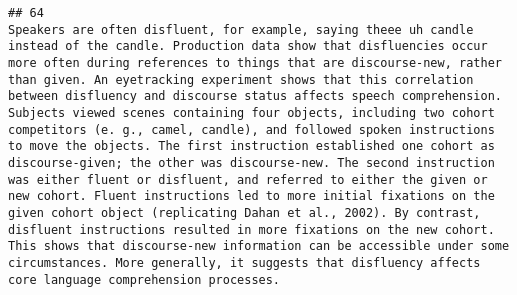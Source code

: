 \documentclass[
  english,
  man]{apa6}
\begin{document}
\begin{verbatim}
## 64                                                                                                                                                                                                                                                                                                                                                                                                                                                                                                                                                                                                                                                                                                                                                                                                                                                                                                                                                                                                                                                                                                                                                                                                                                                                                                                                                                                                                                                                                                                                                                 Speakers are often disfluent, for example, saying theee uh candle instead of the candle. Production data show that disfluencies occur more often during references to things that are discourse-new, rather than given. An eyetracking experiment shows that this correlation between disfluency and discourse status affects speech comprehension. Subjects viewed scenes containing four objects, including two cohort competitors (e. g., camel, candle), and followed spoken instructions to move the objects. The first instruction established one cohort as discourse-given; the other was discourse-new. The second instruction was either fluent or disfluent, and referred to either the given or new cohort. Fluent instructions led to more initial fixations on the given cohort object (replicating Dahan et al., 2002). By contrast, disfluent instructions resulted in more fixations on the new cohort. This shows that discourse-new information can be accessible under some circumstances. More generally, it suggests that disfluency affects core language comprehension processes.

\end{verbatim}
\end{document}
